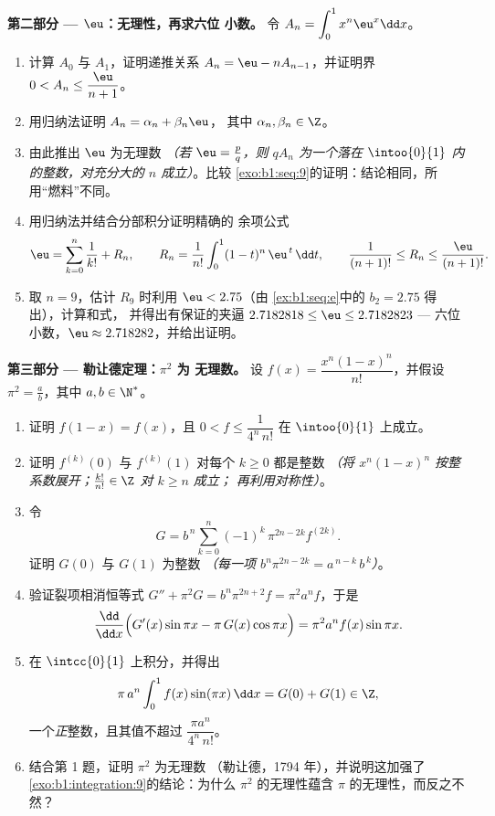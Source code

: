 \begin{problem}
\medskip
\noindent\textbf{第二部分 --- $\eu$：无理性，再求六位
小数。} 令 $A_n = \displaystyle\int_0^1 x^n \eu^x \dd x$。
\begin{enumerate}[resume]
  \item 计算 $A_0$ 与 $A_1$，证明递推关系 $A_n = \eu
        - n A_{n-1}$，并证明界 $0 < A_n \leq
        \dfrac{\eu}{n+1}$。
  \item 用归纳法证明 $A_n = \alpha_n + \beta_n \eu$，
        其中 $\alpha_n, \beta_n \in \Z$。
  \item 由此推出 $\eu$ 为无理数 \emph{（若 $\eu = \frac
        pq$，则 $q A_n$ 为一个落在
        $\intoo{0}{1}$ 内的整数，对充分大的 $n$ 成立）}。比较
        \cref{exo:b1:seq:9}的证明：结论相同，所用“燃料”不同。
  \item 用归纳法并结合分部积分证明精确的
        余项公式
        \[
        \eu = \sum_{k=0}^{n} \frac{1}{k!} + R_n,
        \qquad
        R_n = \frac{1}{n!}\int_0^1 (1 - t)^n\,\eu^{\,t}\,\dd t,
        \qquad
        \frac{1}{(n+1)!} \leq R_n \leq \frac{\eu}{(n+1)!} .
        \]
  \item 取 $n = 9$，估计 $R_9$ 时利用 $\eu < 2.75$（由
        \cref{ex:b1:seq:e}中的 $b_2 = 2.75$ 得出），计算和式，
        并得出有保证的夹逼 $2.7182818 \leq
        \eu \leq 2.7182823$ --- 六位小数，$\eu \approx
        2.718282$，并给出证明。
\end{enumerate}

\medskip
\noindent\textbf{第三部分 --- 勒让德定理：$\pi^2$ 为
无理数。} 设 $f(x) = \dfrac{x^n (1 - x)^n}{n!}$，并假设
$\pi^2 = \frac ab$，其中 $a, b \in \N^*$。
\begin{enumerate}[resume]
  \item 证明 $f(1 - x) = f(x)$，且 $0 < f \leq
        \dfrac{1}{4^n\,n!}$ 在 $\intoo{0}{1}$ 上成立。
  \item 证明 $f^{(k)}(0)$ 与 $f^{(k)}(1)$ 对每个
        $k \geq 0$ 都是整数 \emph{（将 $x^n(1-x)^n$ 按整
        系数展开；$\frac{k!}{n!} \in \Z$ 对 $k \geq n$ 成立；
        再利用对称性）}。
  \item 令
        \[
        G = b^{\,n} \sum_{k=0}^{n} (-1)^k\,
        \pi^{2n - 2k} f^{(2k)} .
        \]
        证明 $G(0)$ 与 $G(1)$ 为整数 \emph{（每一项
        $b^n \pi^{2n-2k} = a^{\,n-k}\,b^{\,k}$）}。
  \item 验证裂项相消恒等式 $G'' + \pi^2 G = b^n \pi^{2n+2} f
        = \pi^2 a^n f$，于是
        \[
        \frac{\dd}{\dd x}\Bigl(G'(x)\sin \pi x - \pi\,G(x)\cos
        \pi x\Bigr) = \pi^2 a^n f(x)\sin \pi x .
        \]
  \item 在 $\intcc{0}{1}$ 上积分，并得出
        \[
        \pi\,a^n \int_0^1 f(x)\sin(\pi x)\,\dd x = G(0) + G(1)
        \in \Z ,
        \]
        一个\emph{正}整数，且其值不超过 $\dfrac{\pi
        a^n}{4^n\,n!}$。
  \item 结合第 1 题，证明 $\pi^2$ 为无理数
        （勒让德，1794 年），并说明这加强了
        \cref{exo:b1:integration:9}的结论：为什么
        $\pi^2$ 的无理性蕴含 $\pi$ 的无理性，而反之不然？
\end{enumerate}


\end{problem}
